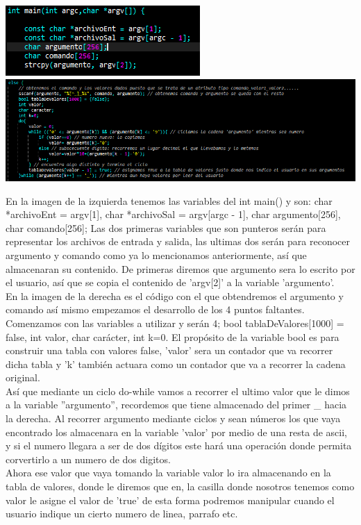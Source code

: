 \documentclass[12pt,letterpaper]{report}
\begin{document}
\begin{multicols}{2}

\includegraphics[scale=0.9]{variablesint}
\includegraphics[scale=0.5]{obtArgCom}

\end{multicols}
En la imagen de la izquierda tenemos las variables del int main() y son:
char *archivoEnt = argv[1], char *archivoSal = argv[argc - 1], char argumento[256], char comando[256];
Las dos primeras variables que son punteros serán para representar los archivos de entrada y salida, las ultimas dos serán para reconocer argumento y comando como ya lo mencionamos anteriormente, así que almacenaran su contenido. De primeras diremos que argumento sera lo escrito por el usuario, así que se copia el contenido de 'argv[2]' a la variable 'argumento'.\\
En la imagen de la derecha es el código con el que obtendremos el argumento y comando así mismo empezamos el desarrollo de los 4 puntos faltantes. Comenzamos con las variables a utilizar y serán 4; bool tablaDeValores[1000] = {false}, int valor, char carácter, int k=0. El propósito de la variable bool es para construir una tabla con valores false, 'valor' sera un contador que va recorrer dicha tabla y 'k' también actuara como un contador que va a recorrer la cadena original. \\
Así que mediante un ciclo do-while vamos a recorrer el ultimo valor que le dimos a la variable ''argumento'', recordemos que tiene almacenado del primer \_ hacia la derecha. Al recorrer argumento mediante ciclos y sean números los que vaya encontrado los almacenara en la variable 'valor' por medio de una resta de ascii, y si el numero llegara a ser de dos dígitos este hará una operación donde permita corvertirlo a un numero de dos digitos.\\
Ahora ese valor que vaya tomando la variable valor lo ira almacenando en la tabla de valores, donde le diremos que en, la casilla donde nosotros tenemos como valor le asigne el valor de 'true' de esta forma podremos manipular cuando el usuario indique un cierto numero de linea, parrafo etc.
\end{document}
